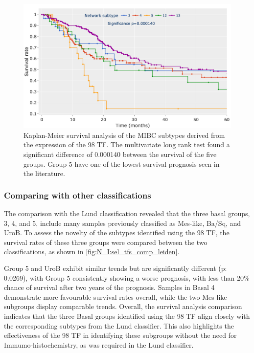 \begin{figure}[!t]
    \centering
    \includegraphics[width=1.0\textwidth,keepaspectratio]{Sections/Network_I/Resources/selective_pruning/sel_tfs/survival_sel_tfs_cs.png}
    \caption[Survival analysis of the five MIBC groups found using the 98 TF]{Kaplan-Meier survival analysis of the MIBC subtypes derived from the expression of the 98 TF. The multivariate long rank test found a significant difference of 0.000140 between the survival of the five groups. Group 5 have one of the lowest survival prognosis seen in the literature. }
    \label{fig:N_I:sel_tfs_survival}
\end{figure} 


\subsubsection*{Comparing with other classifications} \label{s:N_I:sel_tfs_comp_survival}

The comparison with the Lund classification \citep{Marzouka2018-ge} revealed that the three basal groups, 3, 4, and 5, include many samples previously classified as Mes-like, Ba/Sq, and UroB. To assess the novelty of the subtypes identified using the 98 TF, the survival rates of these three groups were compared between the two classifications, as shown in \cref{fig:N_I:sel_tfs_comp_leiden}.

Group 5 and UroB exhibit similar trends but are significantly different (p: 0.0269), with Group 5 consistently showing a worse prognosis, with less than 20\% chance of survival after two years of the prognosis. Samples in Basal 4 demonstrate more favourable survival rates overall, while the two Mes-like subgroups display comparable trends. Overall, the survival analysis comparison indicates that the three Basal groups identified using the 98 TF align closely with the corresponding subtypes from the Lund classifier. This also highlights the effectiveness of the 98 TF in identifying these subgroups without the need for Immumo-histochemistry, as was required in the Lund classifier.

